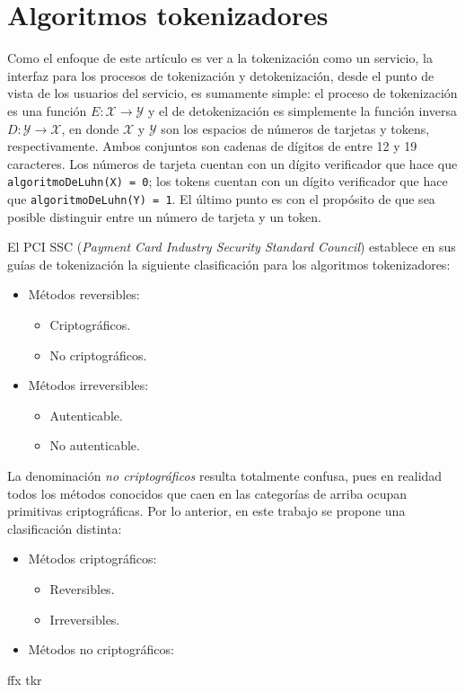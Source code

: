 %
%

\section{Algoritmos tokenizadores}

Como el enfoque de este artículo es ver a la tokenización como un servicio, la
interfaz para los procesos de tokenización y detokenización, desde el punto de
vista de los usuarios del servicio, es sumamente simple: el proceso de
tokenización es una función $ E: \mathcal{X} \rightarrow \mathcal{Y} $ y el de
detokenización es  simplemente la función inversa $ D: \mathcal{Y} \rightarrow
\mathcal{X} $, en donde $ \mathcal{X} $ y $ \mathcal{Y} $ son los espacios de
números de tarjetas y tokens, respectivamente. Ambos conjuntos son cadenas de
dígitos de entre 12 y 19 caracteres. Los números de tarjeta cuentan con un
dígito verificador que hace que \texttt{algoritmoDeLuhn(X) = 0}; los tokens
cuentan con un dígito verificador que hace que \texttt{algoritmoDeLuhn(Y) = 1}.
El último punto es con el propósito de que sea posible distinguir entre un
número de tarjeta y un token.

El PCI SSC (\textit{Payment Card Industry Security Standard Council}) establece
en sus guías de tokenización la siguiente clasificación para los algoritmos
tokenizadores\cite{pci_tokens}:


\begin{itemize}
  \item Métodos reversibles:
  \begin{itemize}
    \item Criptográficos.
    \item No criptográficos.
  \end{itemize}
  \item Métodos irreversibles:
  \begin{itemize}
    \item Autenticable.
    \item No autenticable.
  \end{itemize}
\end{itemize}

La denominación \textit{no criptográficos} resulta totalmente confusa, pues en
realidad todos los métodos conocidos que caen en las categorías de arriba ocupan
primitivas criptográficas. %
Por lo anterior, en este trabajo se propone una clasificación distinta:


\begin{itemize}
  \item Métodos criptográficos:
  \begin{itemize}
    \item Reversibles.
    \item Irreversibles.
  \end{itemize}
  \item Métodos no criptográficos:
\end{itemize}

{ffx}
{tkr}
